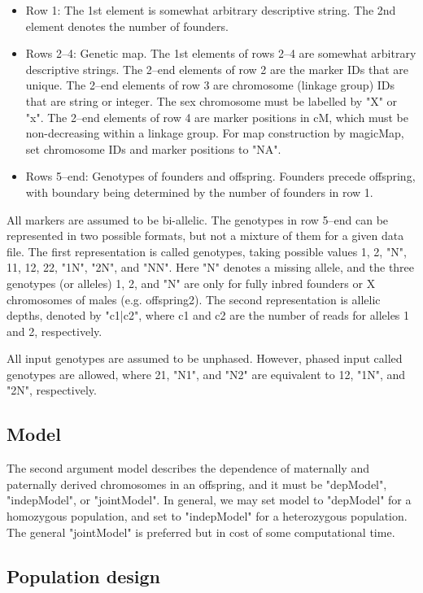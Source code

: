 \documentclass[12pt]{article}
\begin{document}
\begin{itemize}[noitemsep]
\item Row 1: The 1st element is somewhat arbitrary descriptive string. The 2nd element denotes the number of founders. 
\item Rows 2--4: Genetic map. The 1st elements of rows 2--4 are somewhat arbitrary descriptive strings. The 2--end elements of row  2 are the marker IDs that are unique. The 2--end elements of row 3 are chromosome (linkage group) IDs that are string or integer. The sex chromosome must be labelled by "X" or "x". The 2--end elements of row 4 are marker positions in cM, which must be non-decreasing within a linkage group. For map construction by magicMap, set chromosome IDs and marker positions to "NA". 
\item Rows 5--end: Genotypes of founders and offspring. Founders precede offspring, with boundary being determined by the number of founders in row 1. 
\end{itemize}

All markers are assumed to be bi-allelic. The genotypes in row 5--end can be represented in two possible formats, but not a mixture of them for a given data file. The first representation is called genotypes, taking possible values 1, 2, "N", 11, 12, 22, "1N", "2N", and "NN". Here "N" denotes a missing allele, and the three genotypes (or alleles) 1, 2, and "N" are only for fully inbred founders or X chromosomes of males (e.g. offspring2). The second representation is allelic depths, denoted by "c1|c2", where c1 and c2 are the number of reads for alleles 1 and 2, respectively. 

All input genotypes are assumed to be unphased. However, phased input called genotypes are allowed, where 21, "N1", and "N2" are equivalent to 12, "1N", and "2N", respectively. 

\subsection{Model}

The second argument model describes the dependence of maternally and paternally derived chromosomes in an offspring, and it must be "depModel", "indepModel", or "jointModel". In general, we may set model to "depModel" for a homozygous population,  and set to "indepModel" for a heterozygous population. The general "jointModel" is preferred but in cost of some computational time. 

\subsection{Population design}
\end{document}
